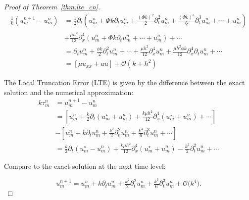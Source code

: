 \begin{proof}[Proof of Theorem~\ref{thm:lte_cn}]
\begin{align*}
    \frac{1}{k}\left(u_m^{n+1} - u_m^n\right) & = \tfrac{1}{2}\partial_t\left(u_m^n + \Phi k \partial_t u_m^n + \frac{(\Phi k)^2}{2} \partial_t^2 u_m^n + \frac{(\Phi k)^3}{6} \partial_t^3 u_m^n + \cdots + u_m^n\right)                                       \\
                                              & + \tfrac{\mu h^2}{12}\partial_x^4 \left(u_m^n + \Phi k \partial_t u_m^n + \cdots + u_m^n\right) + \cdots                                                                                                        \\
                                              & = \partial_t u_m^n + \tfrac{\phi k}{2}\partial_t^2 u_m^n + \cdots + \tfrac{\mu h^2}{12}\partial_x^4 u_m^n + \tfrac{\mu h^2\phi k}{12}\partial_x^4\partial_t u_m^n + \cdots                                      \\
                                              & = \left[\mu u_{xx} + au\right] + \mathcal{O}(k + h^2)
  \end{align*}

  The Local Truncation Error (LTE) is given by the difference between the exact solution and the numerical approximation:
  \begin{align*}
    k\tau_m^n & = u_m^{n+1} - u_m^n                                                                                                                                                   \\
              & = \left[u_m^n + \tfrac{k}{2}\partial_t\left(u_m^\star + u_m^n\right) + \tfrac{k \mu h^2}{12}\partial_x^4 \left(u_m^\star + u_m^n\right) + \cdots\right]               \\
              & - \left[u_m^n + k\partial_t u_m^n + \tfrac{k^2}{2}\partial_t^2 u_m^n + \tfrac{k^3}{6}\partial_t^3 u_m^n + \cdots\right]                                               \\
              & = \tfrac{k}{2}\partial_t\left(u_m^\star - u_m^n\right) + \tfrac{k \mu h^2}{12}\partial_x^4 \left(u_m^\star + u_m^n\right) - \tfrac{k^2}{2}\partial_t^2 u_m^n + \cdots
  \end{align*}


  Compare to the exact solution at the next time level:

  \[
    u_m^{n+1}
    = u_m^n
    + k\partial_t u_m^n
    + \tfrac{k^2}{2}\partial_t^2 u_m^n
    + \tfrac{k^3}{6}\partial_t^3 u_m^n
    + \mathcal{O}\bigl(k^4\bigr).
  \]


\end{proof}
